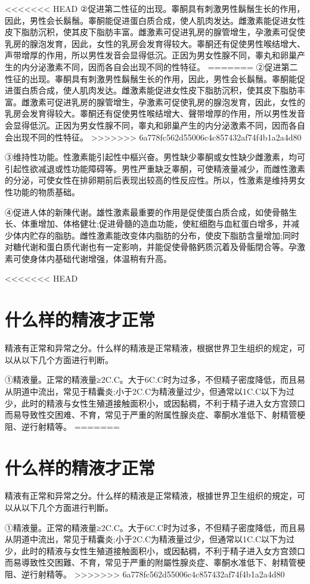 \documentclass[12pt,UTF8]{ctexbook}
\begin{document}
<<<<<<< HEAD
②促进第二性征的出现。睾酮具有刺激男性鬍鬚生长的作用，因此，男性会长鬍鬚。睾酮能促进蛋白质合成，使人肌肉发达。雌激素能促进女性皮下脂肪沉积，使其皮下脂肪丰富。雌激素可促进乳房的腺管增生，孕激素可促使乳房的腺泡发育，因此，女性的乳房会发育得较大。睾酮还有促使男性喉结增大、声带增厚的作用，所以男性发音会显得低沉。正因为男女性腺不同，睾丸和卵巢产生的内分泌激素不同，因而各自会出现不同的性特征。
=======
②促进第二性征的出现。睾酮具有刺激男性鬍鬚生长的作用，因此，男性会长鬍鬚。睾酮能促进蛋白质合成，使人肌肉发达。雌激素能促进女性皮下脂肪沉积，使其皮下脂肪丰富。雌激素可促进乳房的腺管增生，孕激素可促使乳房的腺泡发育，因此，女性的乳房会发育得较大。睾酮还有促使男性喉结增大、聲带增厚的作用，所以男性发音会显得低沉。正因为男女性腺不同，睾丸和卵巢产生的内分泌激素不同，因而各自会出现不同的性特征。
>>>>>>> 6a778fc562d55006c4c857432af74f4b1a2a4d80

③维持性功能。性激素能引起性中樞兴奋。男性缺少睾酮或女性缺少雌激素，均可引起性欲减退或性功能障碍等。男性严重缺乏睾酮，可使精液量减少，而雌性激素的分泌，可使女性在排卵期前后表现出较高的性反应性。所以，性激素是维持男女性功能的物质基础。

④促进人体的新陳代谢。雄性激素最重要的作用是促使蛋白质合成，如使骨骼生长、体重增加、体格健壮;促进骨髓的造血功能，使紅细胞与血紅蛋白增多，并减少体内贮存的脂肪。雌性激素能改变体内脂肪的分布，使皮下脂肪含量增加;同时对糖代谢和蛋白质代谢也有一定影响，并能促使骨骼鈣质沉着及骨骺閉合等。孕激素可使身体内基础代谢增强，体温稍有升高。

<<<<<<< HEAD
\section{什么样的精液才正常}

精液有正常和异常之分。什么样的精液是正常精液，根据世界卫生组织的规定，可以从以下几个方面进行判断。

①精液量。正常的精液量≥2C.C。大于6C.C时为过多，不但精子密度降低，而且易从阴道中流出，常见于精囊炎;小于2C.C为精液量过少，但通常以1C.C以下为过少，此时的精液与女性生殖道接触面积小，或因黏稠，不利于精子进入女方宫颈口而易导致性交困难、不育，常见于严重的附属性腺炎症、睾酮水准低下、射精管梗阻、逆行射精等。
=======
\section{什么样的精液才正常}

精液有正常和异常之分。什么样的精液是正常精液，根據世界卫生组织的規定，可以从以下几个方面进行判斷。

①精液量。正常的精液量≥2C.C。大于6C.C时为过多，不但精子密度降低，而且易从阴道中流出，常见于精囊炎;小于2C.C为精液量过少，但通常以1C.C以下为过少，此时的精液与女性生殖道接触面积小，或因黏稠，不利于精子进入女方宫颈口而易導致性交困難、不育，常见于严重的附屬性腺炎症、睾酮水准低下、射精管梗阻、逆行射精等。
>>>>>>> 6a778fc562d55006c4c857432af74f4b1a2a4d80
\end{document}
